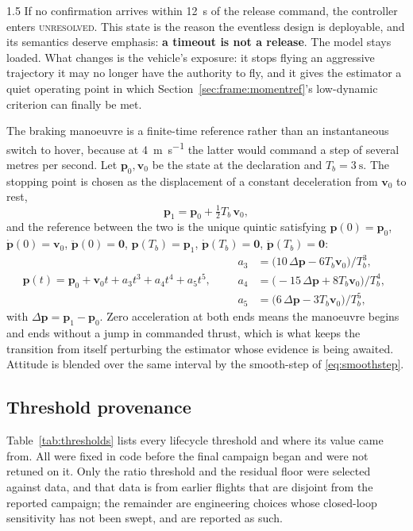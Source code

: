 \begin{spacing}{1.5}
If no confirmation arrives within \SI{12}{\second} of the release command, the
controller enters \textsc{unresolved}. This state is the reason the eventless
design is deployable, and its semantics deserve emphasis: \textbf{a timeout is
not a release}. The model stays loaded. What changes is the vehicle's exposure:
it stops flying an aggressive trajectory it may no longer have the authority to
fly, and it gives the estimator a quiet operating point in which
Section~\ref{sec:frame:momentref}'s low-dynamic criterion can finally be met.

The braking manoeuvre is a finite-time reference rather than an instantaneous
switch to hover, because at \SI{4}{\meter\per\second} the latter would command a
step of several metres per second. Let $\bm p_0,\bm v_0$ be the state at the
declaration and $T_b=\SI{3}{\second}$. The stopping point is chosen as the
displacement of a constant deceleration from $\bm v_0$ to rest,
\begin{equation}
\bm p_1 = \bm p_0 + \tfrac{1}{2} T_b\, \bm v_0 ,
\label{eq:brakep1}
\end{equation}
and the reference between the two is the unique quintic satisfying
$\bm p(0)=\bm p_0$, $\dot{\bm p}(0)=\bm v_0$, $\ddot{\bm p}(0)=\bm 0$,
$\bm p(T_b)=\bm p_1$, $\dot{\bm p}(T_b)=\bm 0$, $\ddot{\bm p}(T_b)=\bm 0$:
\begin{equation}
\bm p(t) = \bm p_0 + \bm v_0 t + a_3 t^3 + a_4 t^4 + a_5 t^5,
\qquad
\begin{aligned}
a_3 &= \bigl(10\,\Delta\bm p - 6 T_b \bm v_0\bigr)/T_b^3,\\
a_4 &= \bigl(-15\,\Delta\bm p + 8 T_b \bm v_0\bigr)/T_b^4,\\
a_5 &= \bigl(6\,\Delta\bm p - 3 T_b \bm v_0\bigr)/T_b^5,
\end{aligned}
\label{eq:quintic}
\end{equation}
with $\Delta\bm p=\bm p_1-\bm p_0$. Zero acceleration at both ends means the
manoeuvre begins and ends without a jump in commanded thrust, which is what
keeps the transition from itself perturbing the estimator whose evidence is being
awaited. Attitude is blended over the same interval by the smooth-step of
\eqref{eq:smoothstep}.

\subsection{Threshold provenance}\label{sec:frame:thresholds}

Table~\ref{tab:thresholds} lists every lifecycle threshold and where its value
came from. All were fixed in code before the final campaign began and were not
retuned on it. Only the ratio threshold and the residual floor were selected
against data, and that data is from earlier flights that are disjoint from the
reported campaign; the remainder are engineering choices whose closed-loop
sensitivity has not been swept, and are reported as such.


\end{spacing}
